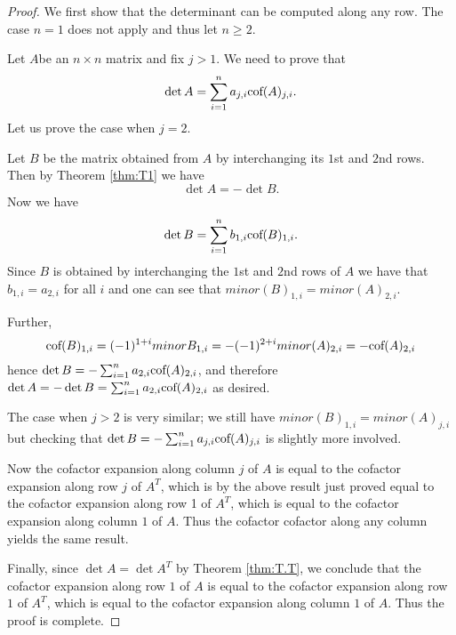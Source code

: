 \begin{proof} We first show that the determinant can be computed along any row. The case $n=1$ does not apply and thus let $n \geq 2$. 


Let $A$be an $n\times n$ matrix and fix $j>1$. We need to prove that
\[
	\det A=\sum_{i=1}^n a_{j,i} \mbox{\rm cof}(A)_{j,i}. 
\]
Let us prove the case when $j=2$. 

Let $B$ be the matrix obtained from $A$ by interchanging its $1$st and $2$nd rows. 
Then by  Theorem \ref{thm:T1} we have
\[
\det A=-\det B. 
\]
Now we have 
\[
\det B=\sum_{i=1}^n b_{1,i} \mbox{\rm cof}(B)_{1,i}. 
\]
Since $B$ is obtained by interchanging the $1$st and $2$nd rows of $A$
we have that $b_{1,i}=a_{2,i}$ for all $i$
and one can see that $minor(B)_{1,i}=minor(A)_{2,i}$. 

Further, 
\[
\mbox{\rm cof}(B)_{1,i}=(-1)^{1+i} minor B_{1,i}=- (-1)^{2+i} minor (A)_{2,i} = - \mbox{\rm cof}(A)_{2,i}
\]
hence $\det B=-\sum_{i=1}^n a_{2,i} \mbox{\rm cof}(A)_{2,i}$, and therefore 
$\det A=-\det B=
\sum_{i=1}^n a_{2,i} \mbox{\rm cof}(A)_{2,i}$ as desired. 

The case when $j>2$ is very similar; we still have
$minor(B)_{1,i}=minor (A)_{j,i}$ but checking that $\det
B=-\sum_{i=1}^n a_{j,i} \mbox{\rm cof}(A)_{j,i}$ is slightly more
involved.

Now the cofactor expansion along column $j$ of $A$ is equal to the
cofactor expansion along row $j$ of $A^T$, which is by the above
result just proved equal to the cofactor expansion along row 1 of
$A^T$, which is equal to the cofactor expansion along column $1$ of
$A$. Thus the cofactor cofactor along any column yields the same result. 

Finally, since $\det A=\det A^T$ by  Theorem \ref{thm:T.T}, we conclude that 
the cofactor expansion along row $1$ of $A$ is equal to 
the cofactor expansion along row $1$ of $A^T$, which  is equal to 
the cofactor expansion along column $1$ of $A$. Thus the proof is complete. 
\end{proof} 
